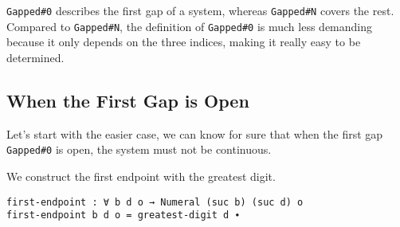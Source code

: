 \documentclass[\main/thesis.tex]{subfiles}
\begin{document}
\lstinline|Gapped#0| describes the first gap of a system, whereas
\lstinline|Gapped#N| covers the rest.
Compared to \lstinline|Gapped#N|, the definition of \lstinline|Gapped#0| is much
less demanding because it only depends on the three indices, making it really
easy to be determined.

\subsection{When the First Gap is Open}

Let's start with the easier case, we can know for sure that when the first gap
\lstinline|Gapped#0| is open, the system must not be continuous.

\begin{center}
    \begin{adjustbox}{max width=\textwidth}
    \end{adjustbox}
\end{center}

We construct the first endpoint with the greatest digit.

\begin{lstlisting}
first-endpoint : ∀ b d o → Numeral (suc b) (suc d) o
first-endpoint b d o = greatest-digit d ∙
\end{lstlisting}
\end{document}
